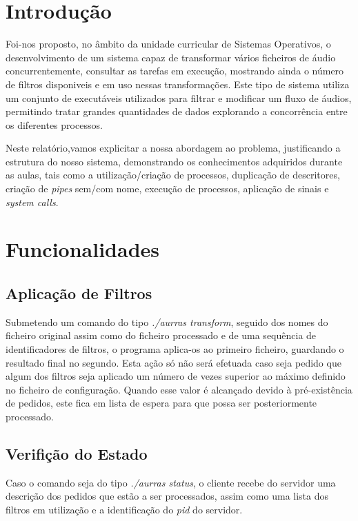 \documentclass[11pt,a4paper]{report}
\begin{document}
\tableofcontents %

\chapter{Introdução}

Foi-nos proposto, no âmbito da unidade curricular de Sistemas Operativos, o desenvolvimento de um sistema capaz de transformar vários ficheiros de áudio concurrentemente, consultar as tarefas em execução, mostrando ainda o número de filtros disponiveis e em uso nessas transformações. Este tipo de sistema utiliza um conjunto de executáveis utilizados para filtrar e modificar um fluxo de áudios, permitindo tratar grandes quantidades de dados explorando a concorrência entre os diferentes processos.

Neste relatório,vamos explicitar a nossa abordagem ao problema, justificando a estrutura do nosso sistema, demonstrando os conhecimentos adquiridos durante as aulas, tais como a utilização/criação de processos, duplicação de descritores, criação de \emph{pipes} sem/com nome, execução de processos, aplicação de sinais e \emph{system calls}.

\chapter{Funcionalidades}

\section{Aplicação de Filtros}

Submetendo um comando do tipo \emph{./aurras transform}, seguido dos nomes do ficheiro original assim como do ficheiro processado e de uma sequência de identificadores de filtros, o programa aplica-os ao primeiro ficheiro, guardando o resultado final no segundo. Esta ação só não será efetuada caso seja pedido que algum dos filtros seja aplicado um número de vezes superior ao máximo definido no ficheiro de configuração. Quando esse valor é alcançado devido à pré-existência de pedidos, este fica em lista de espera para que possa ser posteriormente processado.

\section{Verifição do Estado}

Caso o comando seja do tipo \emph{./aurras status}, o cliente recebe do servidor uma descrição dos pedidos que estão a ser processados, assim como uma lista dos filtros em utilização e a identificação do \emph{pid} do servidor.
\end{document}
